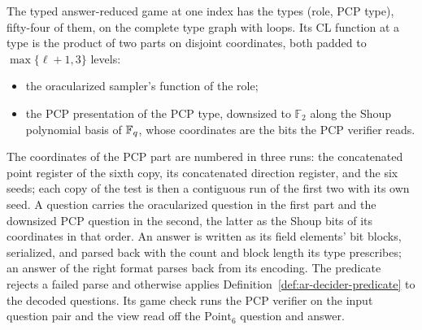 \begin{definition}
\label{def:ar-typed-game}
\leanok
The typed answer-reduced game at one index has the types (role, PCP type), fifty-four of them,
on the complete type graph with loops. Its CL function at a type is the product of two parts on
disjoint coordinates, both padded to $\max\{\ell+1,3\}$ levels:
\begin{itemize}
\item the oracularized sampler's function of the role;
\item the PCP presentation of the PCP type, downsized to $\mathbb{F}_2$ along the Shoup
  polynomial basis of $\mathbb{F}_q$, whose coordinates are the bits the PCP verifier reads.
\end{itemize}
The coordinates of the PCP part are numbered in three runs: the concatenated point register of
the sixth copy, its concatenated direction register, and the six seeds; each copy of the test is
then a contiguous run of the first two with its own seed. A question carries the oracularized
question in the first part and the downsized PCP question in the second, the latter as the Shoup
bits of its coordinates in that order. An answer is written as its field
elements' bit blocks, serialized, and parsed back with the count and block length its type
prescribes; an answer of the right format parses back from its encoding. The predicate rejects a
failed parse and otherwise applies Definition~\ref{def:ar-decider-predicate} to the decoded
questions. Its game check runs the PCP verifier on the input question pair and the view read off
the $\mathrm{Point}_6$ question and answer.
\end{definition}


